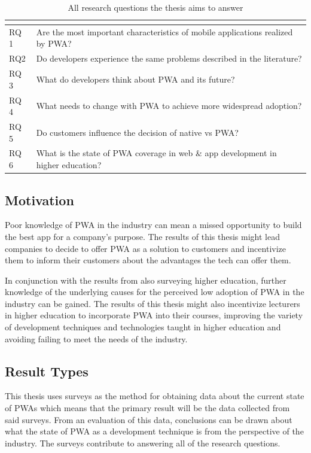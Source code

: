 \documentclass[a4paper,12pt]{article}
\begin{document}
\begin{table}[t]
\centering
{}
\begin{tabular}{|l|p{12.5cm}|}
\hline
\multicolumn{2}{|c|}{\cellcolor[HTML]{343434}{\color[HTML]{FFFFFF} Research questions}} \\ \hline
RQ 1 & Are the most important characteristics of mobile applications realized by PWA? \\
RQ2 & Do developers experience the same problems described in the literature? \\
RQ 3 & What do developers think about PWA and its future? \\
RQ 4 & What needs to change with PWA to achieve more widespread adoption? \\
RQ 5 & Do customers influence the decision of native vs PWA? \\
RQ 6 & What is the state of PWA coverage in web \& app development in higher education? \\ \hline
\end{tabular}
\caption{All research questions the thesis aims to answer}
\label{tab:rqs}
\end{table}

\newpage
\subsection{Motivation}
\label{Intro_motivation}
Poor knowledge of PWA in the industry can mean a missed opportunity to build the best app for a company’s purpose. The results of this thesis might lead companies to decide to offer PWA as a solution to customers and incentivize them to inform their customers about the advantages the tech can offer them.

In conjunction with the results from also surveying higher education, further knowledge of the underlying causes for the perceived low adoption of PWA in the industry can be gained. The results of this thesis might also incentivize lecturers in higher education to incorporate PWA into their courses, improving the variety of development techniques and technologies taught in higher education and avoiding failing to meet the needs of the industry.

\subsection{Result Types}
\label{Intro_results}
This thesis uses surveys as the method for obtaining data about the current state of PWAs which means that the primary result will be the data collected from said surveys. From an evaluation of this data, conclusions can be drawn about what the state of PWA as a development technique is from the perspective of the industry. The surveys contribute to answering all of the research questions.
\end{document}
